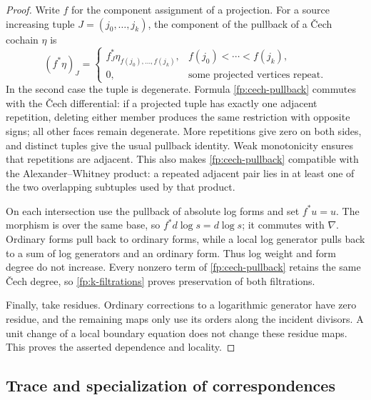 \begin{proof}
Write $f$ for the component assignment of a projection.  For a source
increasing tuple $J=(j_0,\ldots,j_k)$, the component of the pullback of a
\v{C}ech cochain $\eta$ is
\begin{equation}\label{fp:cech-pullback}
 (f^*\eta)_J=
 \begin{cases}
 f_J^*\eta_{f(j_0),\ldots,f(j_k)},&
                 f(j_0)<\cdots<f(j_k),\\
 0,&\text{some projected vertices repeat}.
 \end{cases}
\end{equation}
In the second case the tuple is degenerate.  Formula
\eqref{fp:cech-pullback} commutes with the \v{C}ech differential: if a projected
tuple has exactly one adjacent repetition, deleting either member produces
the same restriction with opposite signs; all other faces remain degenerate.
More repetitions give zero on both sides, and distinct tuples give the usual
pullback identity.  Weak monotonicity ensures that repetitions are adjacent.
This also makes \eqref{fp:cech-pullback} compatible with the
Alexander--Whitney product: a repeated adjacent pair lies in at least one of
the two overlapping subtuples used by that product.

On each intersection use the pullback of absolute log forms and set
$f^*u=u$.  The morphism is over the same base, so $f^*d\log s=d\log s$;
it commutes with $\nabla$.  Ordinary forms pull back to ordinary forms, while
a local log generator pulls back to a sum of log generators and an ordinary
form.  Thus log weight and form degree do not increase.  Every nonzero term
of \eqref{fp:cech-pullback} retains the same \v{C}ech degree, so
\eqref{fp:k-filtrations} proves preservation of both filtrations.

Finally, take residues.  Ordinary corrections to a logarithmic generator
have zero residue, and the remaining maps only use its orders along the
incident divisors.  A unit change of a local boundary equation does not change
these residue maps.  This proves the asserted dependence and locality.
\end{proof}

\subsection{Trace and specialization of correspondences}

